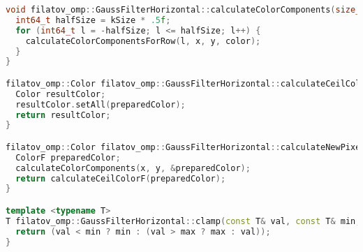 \documentclass{report}
\begin{document}
\begin{lstlisting}[language=C++,caption=OpenMP версия]
void filatov_omp::GaussFilterHorizontal::calculateColorComponents(size_t x, size_t y, ColorF* color) {
  int64_t halfSize = kSize * .5f;
  for (int64_t l = -halfSize; l <= halfSize; l++) {
    calculateColorComponentsForRow(l, x, y, color);
  }
}

filatov_omp::Color filatov_omp::GaussFilterHorizontal::calculateCeilColorF(ColorF preparedColor) {
  Color resultColor;
  resultColor.setAll(preparedColor);
  return resultColor;
}

filatov_omp::Color filatov_omp::GaussFilterHorizontal::calculateNewPixelColor(size_t x, size_t y) {
  ColorF preparedColor;
  calculateColorComponents(x, y, &preparedColor);
  return calculateCeilColorF(preparedColor);
}

template <typename T>
T filatov_omp::GaussFilterHorizontal::clamp(const T& val, const T& min, const T& max) {
  return (val < min ? min : (val > max ? max : val));
}
\end{lstlisting}

\newpage
\end{document}
